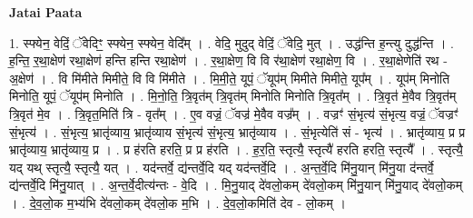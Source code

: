 \documentclass[17pt]{extarticle}
\begin{document}
\textbf{Jatai Paata} \newline

1. स्फ्येन॒ वेदिं॒ ॅवेदिꣳ॒॒ स्फ्येन॒ स्फ्येन॒ वेदि᳚म् । . वेदि॒ मुदुद् वेदिं॒ ॅवेदि॒ मुत् । . उद्ध॑न्ति ह॒न्त्यु दुद्ध॑न्ति । . ह॒न्ति॒ र॒था॒क्षेण॑ रथा॒क्षेण॑ हन्ति हन्ति रथा॒क्षेण॑ । . र॒था॒क्षेण॒ वि वि र॑था॒क्षेण॑ रथा॒क्षेण॒ वि । . र॒था॒क्षेणेति॑ रथ - अ॒क्षेण॑ । . वि मि॑मीते मिमीते॒ वि वि मि॑मीते । . मि॒मी॒ते॒ यूपं॒ ॅयूप॑म् मिमीते मिमीते॒ यूप᳚म् । . यूप॑म् मिनोति मिनोति॒ यूपं॒ ॅयूप॑म् मिनोति । . मि॒नो॒ति॒ त्रि॒वृत॑म् त्रि॒वृत॑म् मिनोति मिनोति त्रि॒वृत᳚म् । . त्रि॒वृत॑ मे॒वैव त्रि॒वृत॑म् त्रि॒वृत॑ मे॒व । . त्रि॒वृत॒मिति॑ त्रि - वृत᳚म् । . ए॒व वज्रं॒ ॅवज्र॑ मे॒वैव वज्र᳚म् । . वज्रꣳ॑ सं॒भृत्य॑ सं॒भृत्य॒ वज्रं॒ ॅवज्रꣳ॑ सं॒भृत्य॑ । . सं॒भृत्य॒ भ्रातृ॑व्याय॒ भ्रातृ॑व्याय सं॒भृत्य॑ सं॒भृत्य॒ भ्रातृ॑व्याय । . सं॒भृत्येति॑ सं - भृत्य॑ । . भ्रातृ॑व्याय॒ प्र प्र भ्रातृ॑व्याय॒ भ्रातृ॑व्याय॒ प्र । . प्र ह॑रति हरति॒ प्र प्र ह॑रति । . ह॒र॒ति॒ स्तृत्यै॒ स्तृत्यै॑ हरति हरति॒ स्तृत्यै᳚ । . स्तृत्यै॒ यद् यथ् स्तृत्यै॒ स्तृत्यै॒ यत् । . यद॑न्तर्वे॒ द्य॑न्तर्वे॒दि यद् यद॑न्तर्वे॒दि । . अ॒न्त॒र्वे॒दि मि॑नु॒यान् मि॑नु॒या द॑न्तर्वे॒ द्य॑न्तर्वे॒दि मि॑नु॒यात् । . अ॒न्त॒र्वे॒दीत्य॑न्तः - वे॒दि । . मि॒नु॒याद् दे॑वलो॒कम् दे॑वलो॒कम् मि॑नु॒यान् मि॑नु॒याद् दे॑वलो॒कम् । . दे॒व॒लो॒क म॒भ्य॑भि दे॑वलो॒कम् दे॑वलो॒क म॒भि । . दे॒व॒लो॒कमिति॑ देव - लो॒कम् । \newline
\end{document}
